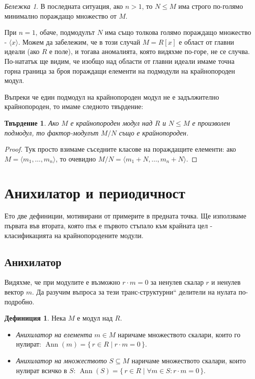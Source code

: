 \documentclass{article}
\newif\ifusemulticols
\theoremstyle{definition}
\newtheorem{deff}{Дефиниция}
\theoremstyle{remark}
\newtheorem*{note}{Бележка}
\theoremstyle{plain}
\theoremstyle{plain}
\newtheorem{prop}[theorem]{Твърдение}
\newenvironment{mymulticols}
    { \ifusemulticols \begin{multicols}{2} \fi }
    { \ifusemulticols \end{multicols} \fi }
\DeclareMathOperator{\Ann}{Ann}
\begin{document}
\begin{mymulticols}
\begin{enumerate}
        \begin{note}
            В последната ситуация, ако $n > 1$, то $N \le M$ има строго по-голямо минимално
            пораждащо множество от $M$.

            При $n = 1$, обаче, подмодулът $N$ има също толкова голямо пораждащо множество -
            $\langle x \rangle$.
            Можем да забележим, че в този случай $M = R[x]$ е област от главни идеали (ако $R$ е
            поле), и тогава аномалията, която видяхме по-горе, не се случва. По-нататък ще видим,
            че изобщо над области от главни идеали имаме точна горна граница за броя пораждащи
            елементи на подмодули на крайнопороден модул.
        \end{note}
\end{enumerate}

Въпреки че един подмодул на крайнопороден модул не е задължително крайнопороден, то имаме следното
твърдение:
\begin{prop}
    Ако $M$ е крайнопороден модул над $R$ и $N \le M$ е произволен подмодул, то фактор-модулът $M /
    N$ също е крайнопороден.
\end{prop}

\begin{proof}
    Тук просто взимаме съседните класове на пораждащите елементи: ако $M = \langle
    m_1,\dots,m_n\rangle$, то очевидно $M/N=\langle m_1+N,\dots,m_n+N\rangle$.
\end{proof}

\section{Анихилатор и периодичност}
Ето две дефиниции, мотивирани от примерите в предната точка. Ще използваме първата във втората,
която пък е първото стъпало към крайната цел - класификацията на крайнопородените модули.

\subsection{Анихилатор}
Видяхме, че при модулите е възможно $r\cdot m = 0$ за ненулев скалар $r$ и ненулев вектор $m$.
Да разучим въпроса за тези \quotedblbase транс-структурни`` делители на нулата по-подробно.

\begin{deff}
    Нека $M$ е модул над $R$.
    \begin{itemize}
        \item \emph{Анихилатор на елемента} $m \in M$ наричаме множеството скалари, които го
            нулират: $\Ann(m) = \{\,r\in R\;|\;r\cdot m=0\,\}$.
        \item \emph{Анихилатор на множеството} $S \subseteq M$ наричаме множеството скалари, които
            нулират всичко в $S$: $\Ann(S)=\{\,r\in R\;|\;\forall m\in S:r\cdot m=0\,\}$.
    \end{itemize}
\end{deff}


\end{mymulticols}
\end{document}
